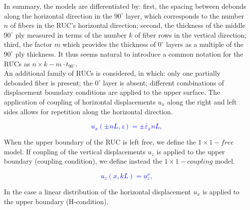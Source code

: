 \documentclass[Review,sagev,times]{sagej}
\begin{document}
In summary, the models are differentiated by: first, the spacing between debonds along the horizontal direction in the $90^{\circ}$ layer, which corresponds to the number $n$ of fibers in the RUC's horizontal direction; second, the thickness of the middle $90^{\circ}$ ply measured in terms of the number $k$ of fiber rows in the vertical direction; third, the factor $m$ which provides the thickness of $0^{\circ}$ layers as a multiple of the $90^{\circ}$ ply thickness. It thus seems natural to introduce a common notation for the RUCs as $n\times k-m\cdot t_{90^{\circ}}$.\\
An additional family of RUCs is considered, in which: only one partially debonded fiber is present; the $0^{\circ}$ layer is absent; different combinations of displacement boundary conditions are applied to the upper surface. The application of coupling of horizontal displacements $u_{x}$ along the right and left sides allows for repetition along the horizontal direction. 

\textcolor{blue}{\begin{equation}
u_{x}\left(\pm nL,z\right)=\pm\bar{\varepsilon}_{x}nL,
\end{equation}}

 When the upper boundary of the RUC is left free, we define the $1\times 1-free$ model. If coupling of the vertical displacements $u_{z}$ is applied to the upper boundary (coupling condition), we define instead the $1\times 1-coupling$ model. 

\textcolor{blue}{\begin{equation}\label{eq:couplingconditions}
u_{z}\left(x,kL\right)=u_{z}^{\nu},
\end{equation}}

 In the case a linear distribution of the horizontal displacement $u_{x}$ is applied to the upper boundary (H-condition), 
\end{document}
